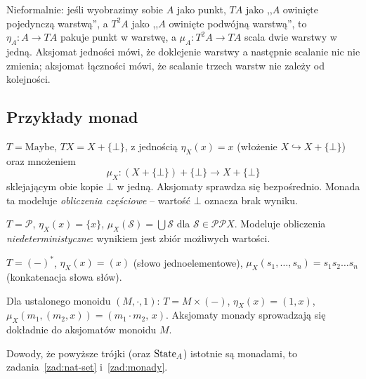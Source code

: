 \begin{uwaga}
Nieformalnie: jeśli wyobrazimy sobie $A$ jako punkt, $TA$ jako ,,$A$ owinięte pojedynczą warstwą'', a $T^2 A$ jako ,,$A$ owinięte podwójną warstwą'', to $\eta_A : A \to TA$ pakuje punkt w warstwę, a $\mu_A : T^2 A \to TA$ scala dwie warstwy w jedną. Aksjomat jedności mówi, że doklejenie warstwy a następnie scalanie nic nie zmienia; aksjomat łączności mówi, że scalanie trzech warstw nie zależy od kolejności.
\end{uwaga}

\subsection*{Przykłady monad}

\begin{przyklad}
$T = \mathrm{Maybe}$, $TX = X + \{\bot\}$, z jednością $\eta_X(x) = x$ (włożenie $X \hookrightarrow X + \{\bot\}$) oraz mnożeniem
\[
\mu_X \colon (X + \{\bot\}) + \{\bot\} \longrightarrow X + \{\bot\}
\]
sklejającym obie kopie $\bot$ w jedną. Aksjomaty sprawdza się bezpośrednio. Monada ta modeluje \emph{obliczenia częściowe} -- wartość $\bot$ oznacza brak wyniku.
\end{przyklad}

\begin{przyklad}
$T = \mathcal{P}$, $\eta_X(x) = \{x\}$, $\mu_X(\mathcal{S}) = \bigcup \mathcal{S}$ dla $\mathcal{S} \in \mathcal{P}\mathcal{P}X$. Modeluje obliczenia \emph{niedeterministyczne}: wynikiem jest zbiór możliwych wartości.
\end{przyklad}

\begin{przyklad}
$T = (-)^*$, $\eta_X(x) = (x)$ (słowo jednoelementowe), $\mu_X(s_1, \ldots, s_n) = s_1 s_2 \ldots s_n$ (konkatenacja słowa słów).
\end{przyklad}

\begin{przyklad}
Dla ustalonego monoidu $(M, \cdot, 1)$: $T = M \times (-)$, $\eta_X(x) = (1, x)$, $\mu_X(m_1, (m_2, x)) = (m_1 \cdot m_2,\, x)$. Aksjomaty monady sprowadzają się dokładnie do aksjomatów monoidu $M$.
\end{przyklad}

\begin{uwaga}
Dowody, że powyższe trójki (oraz $\mathrm{State}_A$) istotnie są monadami, to zadania~\ref{zad:nat-set} i~\ref{zad:monady}.
\end{uwaga}

